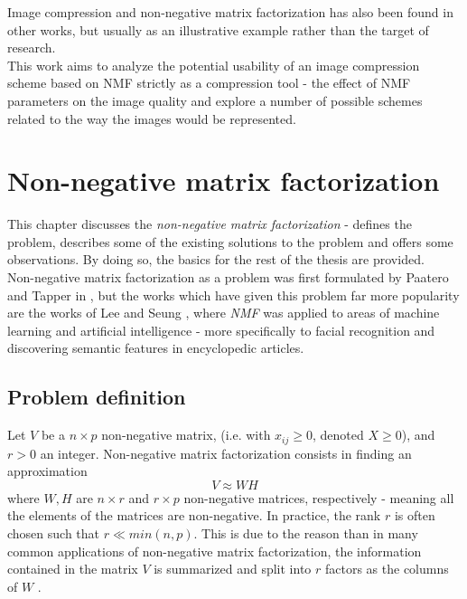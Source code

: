 \documentclass[thesis=M,english]{FITthesis}[2012/10/20]
\begin{document}
Image compression and non-negative matrix factorization has also been found in other works, but
usually as an illustrative example rather than the target of research.
\\

This work aims to analyze the potential usability of an image compression scheme based on NMF
strictly as a compression tool - the effect of NMF parameters on the image quality and explore
a number of possible schemes related to the way the images would be represented.

\chapter{Non-negative matrix factorization}
\label{ch:NMF}
This chapter discusses the \emph{non-negative matrix factorization} - defines
the problem, describes some of the existing solutions to the problem and
offers some observations. By doing so, the basics for the rest of the thesis are
provided.
\\

Non-negative matrix factorization as a problem was first formulated by Paatero
and Tapper in \cite{nmf-paatero}, but the works which have given
this problem far more popularity are the works of Lee and Seung \cite{lee99}, where
\emph{NMF} was applied to areas of machine learning and artificial
intelligence - more specifically to facial recognition and discovering semantic
features in encyclopedic articles.

\section{Problem definition}
Let $V$ be a $n \times p$ non-negative matrix, (i.e. with $x_{ij} \geq 0$, denoted
$X \geq 0$), and $r > 0$ an integer. Non-negative matrix factorization consists in
finding an approximation
\begin{equation}
  V \approx WH
\end{equation}
where $W, H$ are $n \times r$ and $r \times p$ non-negative matrices, respectively - meaning
all the elements of the matrices are non-negative.
In practice, the rank $r$ is often chosen such that $r \ll min(n,p)$. This is due
to the reason than in many common applications of non-negative matrix factorization,
the information contained in the matrix $V$ is summarized and split into $r$ factors
as the columns of $W$ \cite{nmf-r-vignette}.
\\
\end{document}
